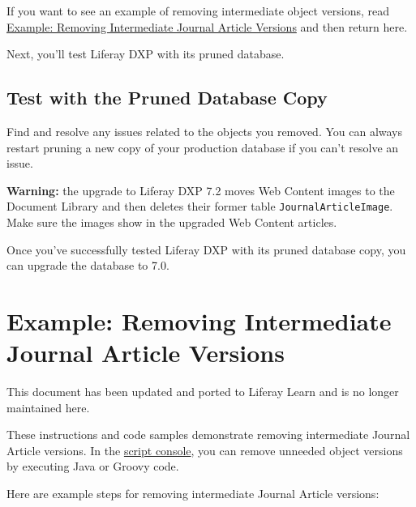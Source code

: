If you want to see an example of removing intermediate object versions,
read
\href{/docs/7-2/deploy/-/knowledge_base/d/example-removing-intermediate-journal-article-versions}{Example:
Removing Intermediate Journal Article Versions} and then return here.

Next, you'll test Liferay DXP with its pruned database.

\section{Test with the Pruned Database
Copy}\label{test-with-the-pruned-database-copy}

Find and resolve any issues related to the objects you removed. You can
always restart pruning a new copy of your production database if you
can't resolve an issue.

\noindent\hrulefill

\textbf{Warning:} the upgrade to Liferay DXP 7.2 moves Web Content
images to the Document Library and then deletes their former table
\texttt{JournalArticleImage}. Make sure the images show in the upgraded
Web Content articles.

\noindent\hrulefill

Once you've successfully tested Liferay DXP with its pruned database
copy, you can upgrade the database to 7.0.

\chapter{Example: Removing Intermediate Journal Article
Versions}\label{example-removing-intermediate-journal-article-versions}

{This document has been updated and ported to Liferay Learn and is no
longer maintained here.}

These instructions and code samples demonstrate removing intermediate
Journal Article versions. In the
\href{/docs/7-2/user/-/knowledge_base/u/running-scripts-from-the-script-console}{script
console}, you can remove unneeded object versions by executing Java or
Groovy code.

Here are example steps for removing intermediate Journal Article
versions:

